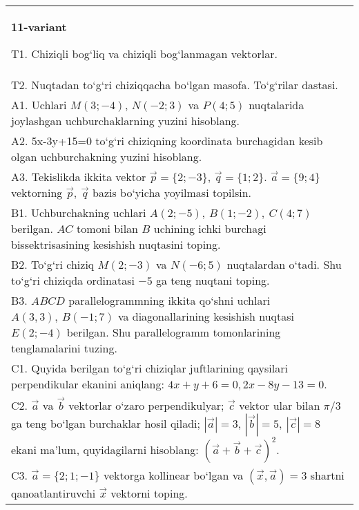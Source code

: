 \documentclass{article}
\begin{document}
\begin{tabular}{m{17cm}}
\textbf{11-variant}

T1. 
Chiziqli bog‘liq va chiziqli bog‘lanmagan vektorlar.
 \\
T2. 
Nuqtadan to‘g‘ri chiziqqacha bo‘lgan masofa. To‘g‘rilar dastasi.
 \\
A1. 
Uchlari $M (3;-4) $, $N (-2;3) $ va $P (4;5) $
nuqtalarida joylashgan uchburchaklarning yuzini hisoblang.
 \\
A2. 
5x-3y+15=0 to‘g‘ri chiziqning koordinata burchagidan
kesib olgan uchburchakning yuzini hisoblang.
 \\
A3. 
Tekislikda ikkita vektor
$\overrightarrow{p} = \{ 2; - 3\}$, $\overrightarrow{q} = \{ 1;2\}$.
$\overrightarrow{a} = \{9;4\}$ vektorning
$\overrightarrow{p},\ \overrightarrow{q}$ bazis bo‘yicha yoyilmasi topilsin.
 \\
B1. 
Uchburchakning uchlari \(A (2;-5),\ B (1;-2),\ C (4;7) \)
berilgan. $AC$ tomoni bilan $B$ uchining ichki burchagi
bissektrisasining kesishish nuqtasini toping.
 \\
B2. 
To‘g‘ri chiziq \(M (2;-3) \) va \(N (-6;5) \) nuqtalardan o‘tadi.
Shu to‘g‘ri chiziqda ordinatasi $-5$ ga teng nuqtani toping.
 \\
B3. 
$ABCD$ parallelogrammning ikkita qo‘shni uchlari
\(A (3,3),\ B (-1;7) \) va diagonallarining kesishish nuqtasi
\(E (2;-4) \) berilgan. Shu parallelogramm tomonlarining tenglamalarini
tuzing.
 \\
C1. 
Quyida berilgan to‘g‘ri chiziqlar juftlarining qaysilari
perpendikular ekanini aniqlang: $4x+y+6=0, 2x-8y-13=0$.
 \\
C2. 
$\vec{a}$ va $\vec{b}$ vektorlar o‘zaro perpendikulyar; $\vec{c}$ vektor ular bilan $\pi/3$ ga teng bo‘lgan burchaklar hosil qiladi; $|\vec{a}| = 3$, $|\vec{b}| = 5,\ |\vec{c}| = 8$ ekani ma’lum, quyidagilarni hisoblang:
$ (\vec{a} + \vec{b} + \vec{c}) ^{2}$.
 \\
C3. 
$\vec{a} = \{ 2;1; - 1\}$ vektorga kollinear bo‘lgan va $\left(\vec{x},\vec{a} \right) = 3$ shartni qanoatlantiruvchi $\vec{x}$ vektorni toping.
 \\

\end{tabular}
\vspace{1cm}
\end{document}
